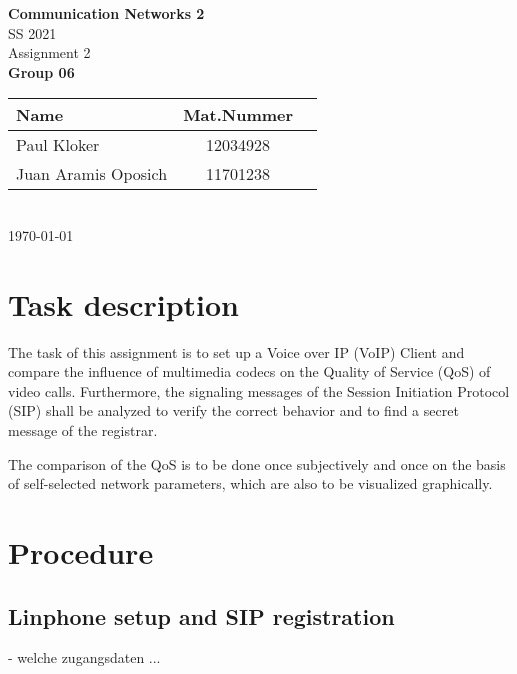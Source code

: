 \documentclass[parskip=full]{scrartcl}
\begin{document}
\begin{titlepage}
    \centering
    \vspace*{2cm}
    {\Huge \textbf{Communication Networks 2}}\\
    SS 2021\\
    \vspace*{1cm}
    {\Large Assignment 2}
    \\\vspace*{3cm}
    {\Large \textbf{Group 06}}\\
    \vspace*{1cm}
    {\large 
        \begin{tabular}{l c c}
            Name & Mat.Nummer \\ \hline
            Paul Kloker & 12034928 \\
            Juan Aramis Oposich & 11701238
        \end{tabular}
    }
    \\\vspace*{7cm}
    \today
\end{titlepage}

\section{Task description} \label{sec:task}
The task of this assignment is to set up a Voice over IP (VoIP) Client and compare the influence of multimedia codecs on the Quality of Service (QoS) of video calls.
Furthermore, the signaling messages of the Session Initiation Protocol (SIP) shall be analyzed to verify the correct behavior and to find a secret message of the registrar.

The comparison of the QoS is to be done once subjectively and once on the basis of self-selected network parameters, which are also to be visualized graphically. 


\section{Procedure} \label{sec:procedure}

\subsection{Linphone setup and SIP registration} \label{subsec:setup}
- welche zugangsdaten ... 
\end{document}
